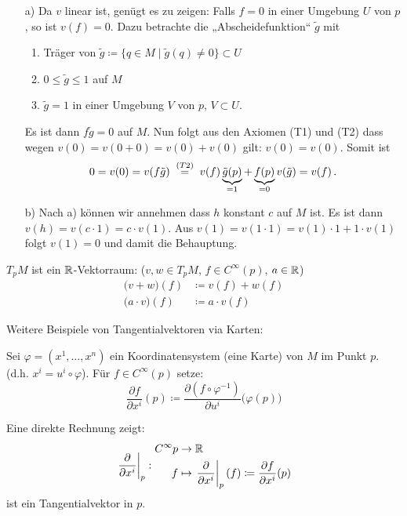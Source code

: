 \documentclass[a4paper,twoside,DIV15,BCOR12mm]{scrbook}
\renewcommand{\da}{\coloneqq}
\begin{document}
\begin{beweis}
\begin{itemize}
\item[a)] Da $v$ linear ist, genügt es zu zeigen: Falls $f=0$ in einer Umgebung $U$ von $p$, so ist $v(f)=0$. Dazu betrachte die „Abscheidefunktion“ $\tilde g$ mit 
\begin{enumerate}
\item Träger von $\tilde g \da \{ q\in M \mid \tilde g(q) \ne 0\} \subset U$
\item $0\le \tilde g \le 1$ auf $M$
\item $\tilde g = 1$ in einer Umgebung $V$ von $p$, $V \subset U$.
\end{enumerate}
Es ist dann $f\tilde g = 0$ auf $M$. Nun folgt aus den Axiomen (T1) und (T2) dass wegen $v(0)= v(0+0) = v(0) + v(0)$ gilt: $v(0)=v(0)$. Somit ist
\[
0 = v(0) = v(f\tilde g) \gleichwegen{(T2)} v(f)\underbrace{\tilde g(p)}_{=1} + \underbrace{f(p)}_{=0}v(\tilde g) = v(f)\,.
\]
\item[b)] Nach a) können wir annehmen dass $h$ konstant $c$ auf $M$ ist. Es ist dann $v(h)= v(c\cdot1) = c\cdot v(1)$. Aus $v(1) = v(1\cdot 1) = v(1)\cdot 1 + 1\cdot v(1)$ folgt $v(1)=0$ und damit die Behauptung.
\end{itemize}
\end{beweis}

$T_pM$ ist ein $\mathbb{R}$-Vektorraum: ($v,w \in T_pM$, $f\in C^\infty(p)$, $a\in\mathbb{R}$)
\begin{align*}
\bigl(v + w\bigr)(f) &\da v(f) + w(f) \\
\bigl(a\cdot v\bigr)(f)   &\da a\cdot v(f) 
\end{align*}


Weitere Beispiele von Tangentialvektoren via Karten:
\newcommand{\ptv}[1]{\left.\frac{\partial}{\partial x^{#1}}\right|_p}

Sei $\varphi=(x^1,\ldots,x^n)$ ein Koordinatensystem (eine Karte) von $M$ im Punkt $p$. (d.h. $x^i=u^i\circ\varphi$). Für $f\in C^{\infty}(p)$ setze:
\[
\frac{\partial f}{\partial x^i}(p) \da \frac{\partial (f\circ \varphi^{-1})}{\partial u^i}\bigl(\varphi(p)\bigr) %
\]

Eine direkte Rechnung zeigt:
\[
\ptv{i}:
\begin{aligned}
C^\infty{p} &\to \MdR \\
f &\mapsto \ptv{i}(f) \da \frac{\partial f}{\partial x^i}(p)
\end{aligned}
\]
ist ein Tangentialvektor in $p$.
\end{document}
